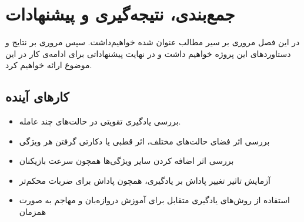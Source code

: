\chapter{جمع‌بندی، نتیجه‌گیری و پیشنهادات}
در این فصل مروری بر سیر مطالب عنوان شده خواهیم‌داشت.
سپس مروری بر نتایج‌ و دستاورد‌های این پروژه خواهیم داشت و در نهایت پیشنهاداتی برای ادامه‌ی کار در این موضوع ارائه خواهیم کرد.
\section{کار‌های آینده}
\begin{itemize}
    \item بررسی یادگیری تقویتی در حالت‌های چند عامله.
    \item بررسی اثر فضای حالت‌های مختلف، اثر قطبی یا دکارتی گرفتن هر ویژگی
    \item بررسی اثر اضافه کردن سایر ویژگی‌ها همچون سرعت بازیکنان
    \item آزمایش تاثیر تغییر پاداش بر یادگیری، همچون پاداش برای ضربات محکم‌تر
    \item استفاده از روش‌های یادگیری متقابل برای آموزش دروازه‌بان و مهاجم به صورت همزمان
\end{itemize}
